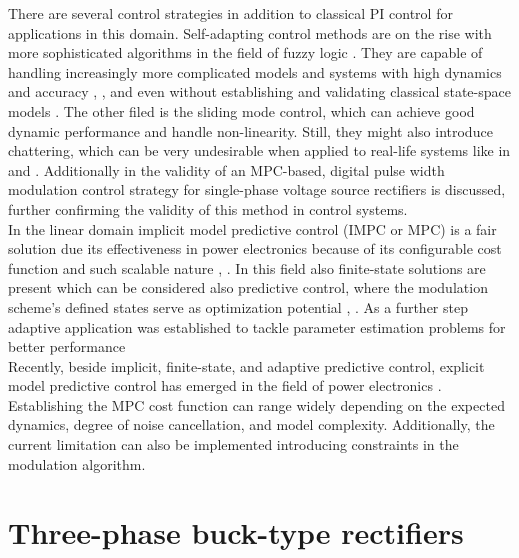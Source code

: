     There are several control strategies in addition to classical PI control for applications in this domain. Self-adapting control methods are on the rise with more sophisticated algorithms in the field of fuzzy logic \cite{urmos2017application}. They are capable of handling increasingly more complicated models and systems with high dynamics and accuracy \cite{chatterjee2008augmented}, \cite{haidegger2012simulation}, and even without establishing and validating classical state-space models \cite{vrkalovic2018model}. The other filed is the sliding mode control, which can achieve good dynamic performance and handle non-linearity. Still, they might also introduce chattering, which can be very undesirable when applied to real-life systems like in \cite{regaya2014new} and \cite{szell2014mathematical}. Additionally in \cite{ahmed2014model} the validity of an MPC-based, digital pulse width modulation control strategy for single-phase voltage source rectifiers is discussed, further confirming the validity of this method in control systems.\\	
    In the linear domain implicit model predictive control (IMPC or MPC) is a fair solution due its effectiveness in power electronics because of its configurable cost function and such scalable nature \cite{kelemen2010constrained}, \cite{ahmed2014model}. In this field also finite-state solutions are present which can be considered also predictive control, where the modulation scheme’s defined states serve as optimization potential \cite{rivera2013predictive}, \cite{godlewska2015predictive}. As a further step adaptive application was established to tackle parameter estimation problems for better performance \cite{muthukumar2016adaptive}\\	
    Recently, beside implicit, finite-state, and adaptive predictive control, explicit model predictive control has emerged in the field of power electronics \cite{kutasi2010constrained}. Establishing the MPC cost function can range widely depending on the expected dynamics, degree of noise cancellation, and model complexity. Additionally, the current limitation can also be implemented introducing constraints in the modulation algorithm.\\	

\section{Three-phase buck-type rectifiers}\label{BASICCSR:sec:CSR}

